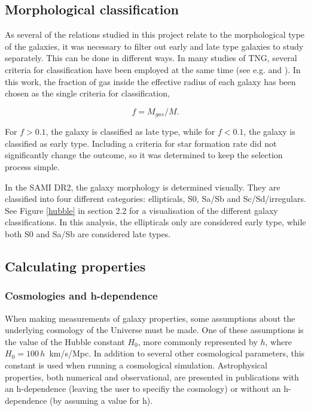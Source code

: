 \subsection{Morphological classification}
As several of the relations studied in this project relate to the morphological type of the galaxies, it was necessary to filter out early and late type galaxies to study separately. This can be done in different ways. In many studies of TNG, several criteria for classification have been employed at the same time (see e.g. \textcite{Lu2020} and \textcite{Genel2017}). In this work, the fraction of gas inside the effective radius of each galaxy has been chosen as the single criteria for classification, 

\begin{equation}
    f = M_{gas}/M.
\end{equation}

For $f > 0.1$, the galaxy is classified as late type, while for $f< 0.1$, the galaxy is classified as early type. Including a criteria for star formation rate did not significantly change the outcome, so it was determined to keep the selection process simple.

In the SAMI DR2, the galaxy morphology is determined visually. They are classified into four different categories: ellipticals, S0, Sa/Sb and Sc/Sd/irregulars. See Figure \ref{hubble} in section 2.2 for a visualisation of the different galaxy classifications. In this analysis, the ellipticals only are considered early type, while both S0 and Sa/Sb are considered late types.

\subsection{Calculating properties}

\subsubsection{Cosmologies and h-dependence} \label{cosmologies}
When making measurements of galaxy properties, some assumptions about the underlying cosmology of the Universe must be made. One of these assumptions is the value of the Hubble constant $H_0$, more commonly represented by $h$, where $H_0 = 100\,h\,$ km/s/Mpc. In addition to several other cosmological parameters, this constant is used when running a cosmological simulation. Astrophysical properties, both numerical and observational, are presented in publications with an h-dependence (leaving the user to specifiy the cosmology) or without an h-dependence (by assuming a value for h).


